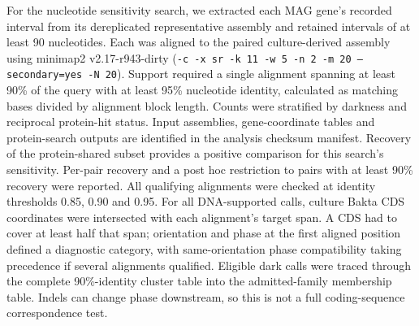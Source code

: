 \documentclass[11pt]{article}
\begin{document}
For the nucleotide sensitivity search, we extracted each MAG gene's recorded interval from its
dereplicated representative assembly and retained intervals of at least 90 nucleotides. Each was
aligned to the paired culture-derived assembly using minimap2 v2.17-r943-dirty
(\texttt{-c -x sr -k 11 -w 5 -n 2 -m 20 --secondary=yes -N 20}). Support required a single
alignment spanning at least 90\% of the query with at least 95\% nucleotide identity, calculated
as matching bases divided by alignment block length. Counts were stratified by darkness and
reciprocal protein-hit status. Input assemblies, gene-coordinate tables and protein-search outputs
are identified in the analysis checksum manifest. Recovery of the protein-shared subset provides
a positive comparison for this search's sensitivity. Per-pair recovery and a post hoc restriction to pairs with at least
90\% recovery were reported. All qualifying alignments were checked at identity thresholds
0.85, 0.90 and 0.95. For all DNA-supported calls, culture Bakta CDS coordinates were
intersected with each alignment's target span. A CDS had to cover at least half that span;
orientation and phase at the first aligned position defined a diagnostic category, with
same-orientation phase compatibility taking precedence if several alignments qualified. Eligible dark calls were traced through the complete 90\%-identity cluster table into the admitted-family membership table. Indels
can change phase downstream, so this is not a full coding-sequence correspondence test.
\end{document}

